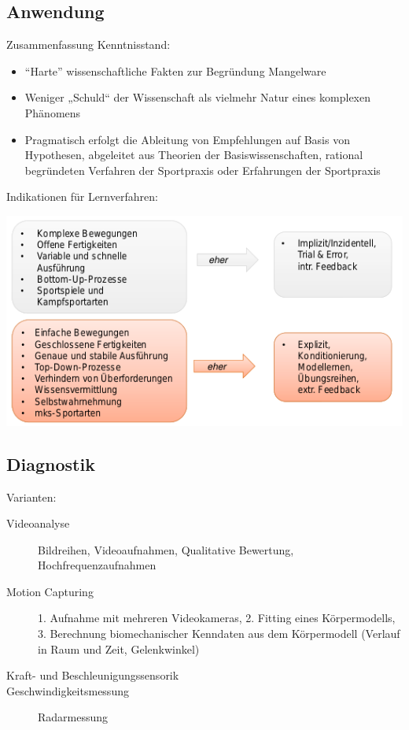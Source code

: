 \subsection{Anwendung}

Zusammenfassung Kenntnisstand:
\begin{itemize}
    \item ``Harte'' wissenschaftliche Fakten zur Begründung Mangelware
    \item Weniger „Schuld“ der Wissenschaft als vielmehr Natur eines komplexen Phänomens
    \item Pragmatisch erfolgt die Ableitung von Empfehlungen auf Basis von Hypothesen, abgeleitet aus Theorien der Basiswissenschaften, rational begründeten Verfahren der Sportpraxis oder Erfahrungen der Sportpraxis
\end{itemize}

Indikationen für Lernverfahren:

\includegraphics[width=\textwidth]{pictures/tech_lernverfahren}

\subsection{Diagnostik}

Varianten:
\begin{description}
    \item[Videoanalyse] Bildreihen, Videoaufnahmen, Qualitative Bewertung, Hochfrequenzaufnahmen
    \item [Motion Capturing] 1. Aufnahme mit mehreren Videokameras, 2. Fitting eines Körpermodells, 3. Berechnung biomechanischer Kenndaten aus dem Körpermodell (Verlauf in Raum und Zeit, Gelenkwinkel)
    \item [Kraft- und Beschleunigungssensorik]
    \item [Geschwindigkeitsmessung] Radarmessung
\end{description}

